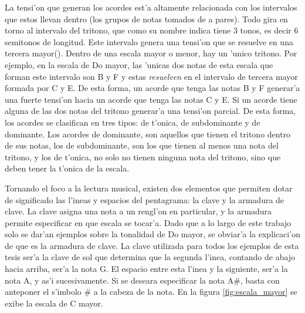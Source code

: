 La tensi'on que generan los acordes est'a altamente relacionada con los intervalos que estos llevan dentro (los grupos de notas tomados de a pares).
Todo gira en torno al intervalo del tritono, que como su nombre indica tiene 3 tonos, es decir 6 semitonos de longitud. Este intervalo genera una 
tensi'on que se resuelve en una tercera mayor(). Dentro de una escala mayor o menor, hay un 'unico tritono. Por ejemplo, en la escala de Do mayor, 
las 'unicas dos notas de esta escala que forman este intervalo son B y F y estas \emph{resuelven} en el intervalo de tercera mayor formada por
C y E. De esta forma, un acorde que tenga las notas B y F generar'a una fuerte tensi'on hacia un acorde que tenga las notas C y E. Si un acorde
tiene alguna de las dos notas del tritono generar'a una tensi'on parcial. De esta forma, los acordes se clasifican en tres tipos: de t'onica,
de subdominante y de dominante. Los acordes de dominante, son aquellos que tienen el tritono dentro de sus notas, los de subdominante, son los 
que tienen al menos una nota del tritono, y los de t'onica, no solo no tienen ninguna nota del tritono, sino que deben tener la t'onica
de la escala.


Tornando el foco a la lectura musical, existen dos elementos que permiten dotar de significado las l'ineas y espacios del pentagrama: la clave
y la armadura de clave. La clave asigna una nota a un rengl'on en particular, y la armadura permite especificar en que escala se tocar'a. 
Dado que a lo largo de este trabajo solo se dar'an ejemplos sobre la tonalidad de Do mayor, se obviar'a la explicaci'on de que es la armadura de clave. 
La clave utilizada para todos los ejemplos de esta tesis ser'a la clave de sol que determina que la segunda l'inea, contando de abajo hacia
arriba, ser'a la nota G. El espacio entre esta l'inea y la siguiente, ser'a la nota A, y as'i sucesivamente. Si se deseara especificar
la nota A\#, basta con anteponer el s'imbolo \# a la cabeza de la nota. En la figura \ref{fig:escala_mayor} se exibe la escala de C mayor.


\begin{imagen}
    \width{12cm}
\end{imagen}
